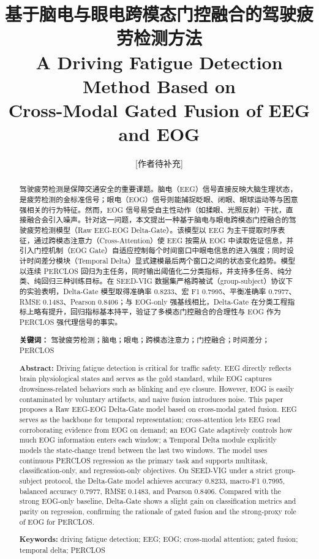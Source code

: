 \documentclass[11pt,a4paper]{ctexart}
\title{基于脑电与眼电跨模态门控融合的驾驶疲劳检测方法\\[4pt]
\large A Driving Fatigue Detection Method Based on\\ Cross-Modal Gated Fusion of EEG and EOG}
\author[1]{[作者待补充]}
\affil[1]{[单位待补充], [城市] [邮编]}
\date{}
\begin{document}
\maketitle

\begin{abstract}
驾驶疲劳检测是保障交通安全的重要课题。脑电（EEG）信号直接反映大脑生理状态，是疲劳检测的金标准信号；眼电（EOG）信号则能捕捉眨眼、闭眼、眼球运动等与困意强相关的行为特征。然而，EOG 信号易受自主性动作（如揉眼、光照反射）干扰，直接融合会引入噪声。针对这一问题，本文提出一种基于脑电与眼电跨模态门控融合的驾驶疲劳检测模型（Raw EEG-EOG Delta-Gate）。该模型以 EEG 为主干提取时序表征，通过跨模态注意力（Cross-Attention）使 EEG 按需从 EOG 中读取佐证信息，并引入门控机制（EOG Gate）自适应控制每个时间窗口中眼电信息的进入强度；同时设计时间差分模块（Temporal Delta）显式建模最后两个窗口之间的状态变化趋势。模型以连续 PERCLOS 回归为主任务，同时输出阈值化二分类指标，并支持多任务、纯分类、纯回归三种训练目标。在 SEED-VIG 数据集严格跨被试（group-subject）协议下的实验表明，Delta-Gate 模型取得准确率 0.8233、宏 F1 0.7995、平衡准确率 0.7977、RMSE 0.1483、Pearson 0.8406；与 EOG-only 强基线相比，Delta-Gate 在分类工程指标上略有提升，回归指标基本持平，验证了多模态门控融合的合理性与 EOG 作为 PERCLOS 强代理信号的事实。
\par\medskip\noindent\textbf{关键词：} 驾驶疲劳检测；脑电；眼电；跨模态注意力；门控融合；时间差分；PERCLOS
\par\medskip\noindent\textbf{Abstract:} Driving fatigue detection is critical for traffic safety. EEG directly reflects brain physiological states and serves as the gold standard, while EOG captures drowsiness-related behaviors such as blinking and eye closure. However, EOG is easily contaminated by voluntary artifacts, and naive fusion introduces noise. This paper proposes a Raw EEG-EOG Delta-Gate model based on cross-modal gated fusion. EEG serves as the backbone for temporal representation; cross-attention lets EEG read corroborating evidence from EOG on demand; an EOG Gate adaptively controls how much EOG information enters each window; a Temporal Delta module explicitly models the state-change trend between the last two windows. The model uses continuous PERCLOS regression as the primary task and supports multitask, classification-only, and regression-only objectives. On SEED-VIG under a strict group-subject protocol, the Delta-Gate model achieves accuracy 0.8233, macro-F1 0.7995, balanced accuracy 0.7977, RMSE 0.1483, and Pearson 0.8406. Compared with the strong EOG-only baseline, Delta-Gate shows a slight gain on classification metrics and parity on regression, confirming the rationale of gated fusion and the strong-proxy role of EOG for PERCLOS.
\par\medskip\noindent\textbf{Keywords:} driving fatigue detection; EEG; EOG; cross-modal attention; gated fusion; temporal delta; PERCLOS
\end{abstract}
\end{document}

